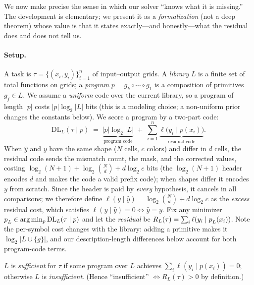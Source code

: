 We now make precise the sense in which our solver ``knows what it is missing.'' The development is
elementary; we present it as a \emph{formalization} (not a deep theorem) whose value is that it states
exactly---and honestly---what the residual does and does not tell us.

\paragraph{Setup.} A task is $\tau=\{(x_i,y_i)\}_{i=1}^n$ of input--output grids. A \emph{library} $L$ is a
finite set of total functions on grids; a \emph{program} $p=g_{k}\circ\cdots\circ g_{1}$ is a composition of
primitives $g_j\in L$. We assume a \emph{uniform} code over the current library, so a program of length $|p|$
costs $|p|\log_2|L|$ bits (this is a modeling choice; a non-uniform prior changes the constants below). We
score a program by a two-part code:
\begin{equation}
\mathrm{DL}_L(\tau\mid p)\;=\;\underbrace{|p|\log_2|L|}_{\text{program code}}\;+\;\sum_{i=1}^{n}\underbrace{\ell\big(y_i\mid p(x_i)\big)}_{\text{residual code}}.
\label{eq:dl}
\end{equation}
When $\hat y$ and $y$ have the same shape ($N$ cells, $c$ colors) and differ in $d$ cells, the residual code
sends the mismatch count, the mask, and the corrected values, costing
$\log_2(N{+}1)+\log_2\binom{N}{d}+d\log_2 c$ bits (the $\log_2(N{+}1)$ header encodes $d$ and makes the code a
valid prefix code); when shapes differ it encodes $y$ from scratch. Since the header is paid by \emph{every}
hypothesis, it cancels in all comparisons; we therefore define
$\ell(y\mid\hat y)=\log_2\binom{N}{d}+d\log_2 c$ as the \emph{excess} residual cost, which satisfies
$\ell(y\mid\hat y)=0\iff\hat y=y$. Fix any minimizer $p^{\*}_L\in\arg\min_p\mathrm{DL}_L(\tau\mid p)$ and let
the \emph{residual} be $R_L(\tau)=\sum_i \ell(y_i\mid p^{\*}_L(x_i))$. Note the per-symbol cost changes with the
library: adding a primitive makes it $\log_2|L\cup\{g\}|$, and our description-length differences below account
for both program-code terms.

\begin{definition}[Sufficiency]
$L$ is \emph{sufficient} for $\tau$ if some program over $L$ achieves $\sum_i\ell(y_i\mid p(x_i))=0$;
otherwise $L$ is \emph{insufficient}. (Hence ``insufficient'' $\iff R_L(\tau)>0$ by definition.)
\end{definition}

